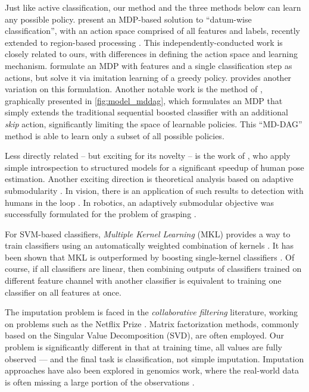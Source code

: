 Just like active classification, our method and the three methods below can learn any possible policy.
\cite{DulacArnold-ML-2012} present an MDP-based solution to ``datum-wise classification'', with an action space comprised of all features and labels, recently extended to region-based processing \parencite{DulacArnold-ICLR-2014}.
This independently-conducted work is closely related to ours, with differences in defining the action space and learning mechanism.
\cite{HeHe-ICMLW-2012} formulate an MDP with features and a single classification step as actions, but solve it via imitation learning of a greedy policy.
\cite{Trapeznikov-ML-2012} provides another variation on this formulation.
Another notable work is the method of \cite{Benbouzid-ICML-2012}, graphically presented in \autoref{fig:model_mddag}, which formulates an MDP that simply extends the traditional sequential boosted classifier with an additional \emph{skip} action, significantly limiting the space of learnable policies.
This ``MD-DAG'' method is able to learn only a subset of all possible policies.

Less directly related -- but exciting for its novelty -- is the work of \parencite{Weiss-ICCV-2013}, who apply simple introspection to structured models for a significant speedup of human pose estimation.
Another exciting direction is theoretical analysis based on adaptive submodularity \parencite{Golovin-and-Krause-2010-JAIR}.
In vision, there is an application of such results to detection with humans in the loop \parencite{Chen-2014-ICML}.
In robotics, an adaptively submodular objective was successfully formulated for the problem of grasping \parencite{Javdani2012}.

For SVM-based classifiers, \emph{Multiple Kernel Learning} (MKL) provides a way to train classifiers using an automatically weighted combination of kernels \parencite{Lanckriet2004}.
It has been shown that MKL is outperformed by boosting single-kernel classifiers \parencite{Gehler2009}.
Of course, if all classifiers are linear, then combining outputs of classifiers trained on different feature channel with another classifier is equivalent to training one classifier on all features at once.

The imputation problem is faced in the \emph{collaborative filtering} literature, working on problems such as the Netflix Prize \parencite{Koren-2009}.
Matrix factorization methods, commonly based on the Singular Value Decomposition (SVD), are often employed.
Our problem is significantly different in that at training time, all values are fully observed --- and the final task is classification, not simple imputation.
Imputation approaches have also been explored in genomics work, where the real-world data is often missing a large portion of the observations \parencite{Hastie-1999}.

